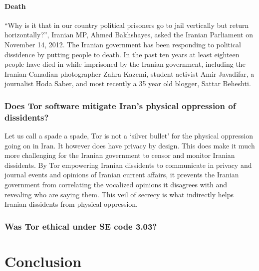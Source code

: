 \documentclass[11pt]{article}
\begin{document}
\begin{multicols}{2}
\paragraph{Death}

``Why is it that in our country political prisoners go to jail vertically but return
horizontally?'', Iranian MP, Ahmed Bakhshayes, asked the Iranian Parliament on
November 14, 2012.\cite{IranBloggersDeath} The Iranian government has been
responding to political dissidence by putting people to death. In the past ten
years at least eighteen people have died in while imprisoned by the Iranian
government, including the Iranian-Canadian photographer Zahra Kazemi, student
activist Amir Javadifar, a journalist Hoda Saber, and most recently a 35 year
old blogger, Sattar Beheshti. \cite{IranBloggersDeath}


\subsubsection{Does Tor software mitigate Iran's physical oppression of
dissidents?}

Let us call a spade a spade, Tor is not a `silver bullet' for the physical
oppression going on in Iran. It however does have privacy by design. This does
make it much more challenging for the Iranian government to censor and monitor
Iranian dissidents. By Tor empowering Iranian dissidents to communicate in
privacy and journal events and opinions of Iranian current affairs, it prevents
the Iranian government from correlating the vocalized opinions it disagrees with
and revealing who are saying them. This veil of secrecy is what indirectly helps
Iranian dissidents from physical oppression.


\subsubsection{Was Tor ethical under SE code 3.03?}

\section{Conclusion} 



\end{multicols}
\end{document}
